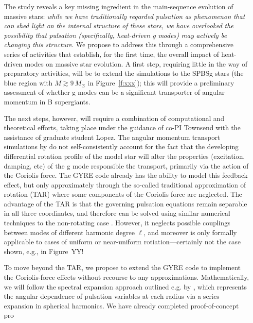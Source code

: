 The \citet{Townsend:2017} study reveals a key missing ingredient in the main-sequence evolution of massive stars: \emph{while we have traditionally regarded pulsation as phenomenon that can shed light on the internal structure of these stars, we have overlooked the possibility that pulsation (specifically, heat-driven g modes) may actively be changing this structure}. We propose to address this through a comprehensive series of activities that establish, for the first time, the overall impact of heat-driven modes on massive star evolution. A first step, requiring little in the way of preparatory activities, will be to extend the \citet{Townsend:2017} simulations to the SPBSg stars (the blue region with $M \gtrsim 9\,M_{\odot}$ in Figure~\ref{f:xxx}); this will provide a preliminary assessment of whether g modes can be a significant transporter of angular momentum in B supergiants.

The next steps, however, will require a combination of computational and theoretical efforts, taking place under the guidance of co-PI Townsend with the assistance of graduate student Lopez. The angular momentum transport simulations by \citet{Townsend:2017} do not self-consistently account for the fact that the developing differential rotation profile of the model star will alter the properties (excitation, damping, etc) of the g mode responsible the transport, primarily via the action of the Coriolis force. The GYRE code already has the ability to model this feedback effect, but only approximately through the so-called traditional approximation of rotation (TAR) where some components of the Coriolis force are neglected. The advantage of the TAR is that the governing pulsation equations remain separable in all three coordinates, and therefore can be solved using similar numerical techniques to the non-rotating case \citep[see, e.g.,][for a demonstration of the TAR applied to rotating SPB stars]{Townsend:2005}. However, it neglects possible couplings between modes of different harmonic degree $\ell$, and moreover is only formally applicable to cases of uniform or near-uniform rotiation---certainly not the case shown, e.g., in Figure~YY!

To move beyond the TAR, we propose to extend the GYRE code to implement the Coriolis-force effects without recourse to any approximations. Mathematically, we will follow the spectral expansion approach outlined e.g. by \citep{Lee:2001}, which represents the angular dependence of pulsation variables at each radius via a series expansion in spherical harmonics. We have already completed proof-of-concept pro